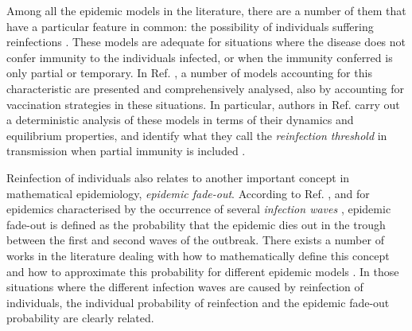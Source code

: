 \documentclass[preprint,12pt]{elsarticle}
\begin{document}
\par Among all the epidemic models in the literature, there are a number of them that have a particular feature in common: the possibility of individuals suffering reinfections \cite{gomes2004infection}. These models are adequate for situations where the disease does not confer immunity to the individuals infected, or when the immunity conferred is only partial or temporary. In Ref. \cite{gomes2004infection}, a number of models accounting for this characteristic are presented and comprehensively analysed, also by accounting for vaccination strategies in these situations. In particular, authors in Ref. \cite{gomes2004infection} carry out a deterministic analysis of these models in terms of their dynamics and equilibrium properties, and identify what they call the {\it reinfection threshold} in transmission when partial immunity is included \cite{breban2005reinfection,gomes2004infection,gomes2005reinfection}.

\par Reinfection of individuals also relates to another important concept in mathematical epidemiology, {\it epidemic fade-out}. According to Ref. \cite{ballard2016probability}, and for epidemics characterised by the occurrence of several {\it infection waves} \cite{camacho2011explaining,grenfell2001travelling}, epidemic fade-out is defined as the probability that the epidemic dies out in the trough between the first and second waves of the outbreak. There exists a number of works in the literature dealing with how to mathematically define this concept and how to approximate this probability for different epidemic models \cite{ballard2016probability,meerson2009wkb,van1997stochastic}. In those situations where the different infection waves are caused by reinfection of individuals, the individual probability of reinfection and the epidemic fade-out probability are clearly related.
\end{document}
